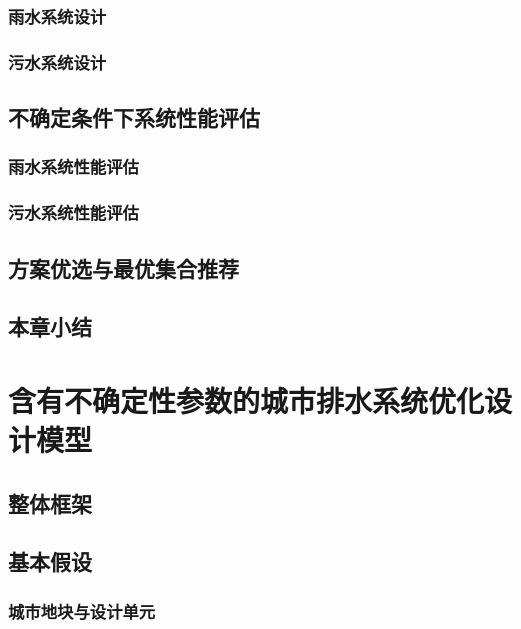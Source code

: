 \documentclass[degree=doctor]{sysuthesis}
\begin{document}
\subsection{雨水系统设计}

\clearpage
\setcounter{page}{57}
\subsection{污水系统设计}

\clearpage
\setcounter{page}{59}
\section{不确定条件下系统性能评估}

\clearpage
\setcounter{page}{60}
\subsection{雨水系统性能评估}

\clearpage
\setcounter{page}{61}
\subsection{污水系统性能评估}

\clearpage
\setcounter{page}{62}
\section{方案优选与最优集合推荐}

\clearpage
\setcounter{page}{63}
\section{本章小结}


\clearpage
\setcounter{page}{64}
\chapter{含有不确定性参数的城市排水系统优化设计模型}
\section{整体框架}

\clearpage
\setcounter{page}{65}
\section{基本假设}
\subsection{城市地块与设计单元}
\end{document}

